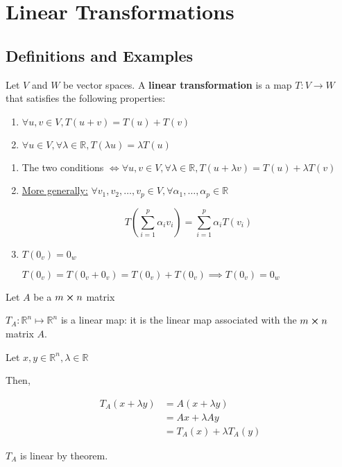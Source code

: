 \chapter{Linear Transformations}

\section{Definitions and Examples}

\begin{definition}
	Let $V$ and $W$ be vector spaces. A \textbf{linear transformation} is a map $T:V \to W$ that satisfies the following properties:

	\begin{enumerate}[1)]
		\item $\forall u, v \in V, T(u + v) = T(u) + T(v)$
		\item $\forall u \in V, \forall \lambda \in \mathbb{R}, T(\lambda u) = \lambda T(u)$
	\end{enumerate}
\end{definition}

\begin{remark}
	\begin{enumerate}[1)]
		\item The two conditions $\iff \forall u, v \in V, \forall \lambda \in \mathbb{R}, T(u + \lambda v) = T(u) + \lambda T(v)$
		\item \underline{More generally:} $\forall v_1, v_2, \ldots, v_p \in V, \forall \alpha_1, \ldots, \alpha_p \in \mathbb{R}$
		
		\begin{equation} \label{eq:map-def}
			T\left(\sum_{i=1}^p \alpha_i v_i\right) = \sum_{i=1}^p \alpha_i T(v_i)
		\end{equation}

		\item $T(0_v) = 0_w$
		
		$T(0_v) = T(0_v + 0_v) = T(0_v) + T(0_v) \implies T(0_v) = 0_w$
	\end{enumerate}
\end{remark}

\begin{example}
	Let $A$ be a $m \cross n$ matrix

	$T_A:\mathbb{R}^n \mapsto \mathbb{R}^n$ is a linear map: it is the linear map associated with the $m \cross n$ matrix $A$.

	Let $x, y \in \mathbb{R}^n, \lambda \in \mathbb{R}$

	Then,
	
	\begin{align}
		T_A(x+\lambda y) &= A(x + \lambda y)\\
		&= Ax + \lambda A y\\
		&= T_A(x) + \lambda T_A(y)
	\end{align}

	$T_A$ is linear by theorem.
\end{example}

